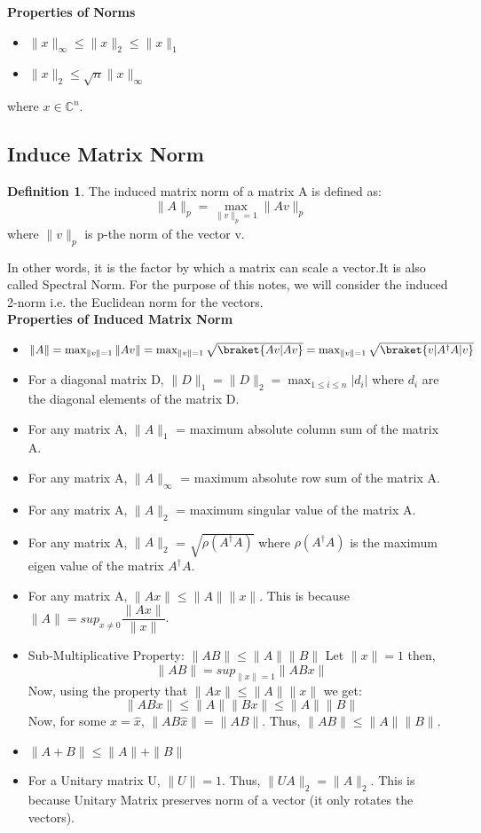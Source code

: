 \documentclass[12pt, oneside]{book}
\theoremstyle{definition}
\newtheorem{definition}{Definition}[section]
\theoremstyle{definition}
\theoremstyle{remark}
\begin{document}
\textbf{Properties of Norms}
\begin{itemize}
    \item $\|x\|_{\infty} \leq \|x\|_2 \leq \|x\|_1$
    \item $\|x\|_2 \leq \sqrt{n}\|x\|_{\infty}$
\end{itemize}
where $x \in \mathbb{C}^n$.\\

\subsection{Induce Matrix Norm}
\begin{definition}
    The induced matrix norm of a matrix A is defined as:
    \[ \|A\|_p=\max_{\|v\|_p=1} \|Av\|_p \]
    where $\|v\|_p$ is p-the norm of the vector v.
\end{definition}
In other words, it is the factor by which a matrix can scale a vector.It is 
also called Spectral Norm. For the purpose of this notes, we will consider the
induced 2-norm i.e. the Euclidean norm for the vectors.\\
\textbf{Properties of Induced Matrix Norm}
\begin{itemize}
    \item $\|A\|=\max_{\|v\|=1} \|Av\|=\max_{\|v\|=1} \sqrt{\braket{Av|Av}}=\max_{\|v\|=1} \sqrt{\braket{v|A^{\dagger}A|v}}$
    \item For a diagonal matrix D, $\|D\|_1 = \|D\|_2=\max_{1\leq i \leq n} |d_i|$ where $d_i$ are the diagonal elements of the matrix D.
    \item For any matrix A, $\|A\|_1$ = maximum absolute column sum of the matrix A.
    \item For any matrix A, $\|A\|_{\infty}$ = maximum absolute row sum of the matrix A.
    \item For any matrix A, $\|A\|_2$ = maximum singular value of the matrix A.
    \item For any matrix A, $\|A\|_2$ = $\sqrt{\rho(A^{\dagger}A)}$ where $\rho(A^{\dagger}A)$ is the maximum eigen value of the matrix $A^{\dagger}A$.
    \item For any matrix A, $\|Ax\|\leq \|A\|\|x\|$. This is because $\|A\| =sup_{x\neq 0} \dfrac{\|Ax\|}{\|x\|}$.
    \item Sub-Multiplicative Property: $\|AB\|\leq \|A\|\|B\|$
    Let $\|x\|=1$ then,
    \[ \|AB\|=sup_{\|x\|=1} \|ABx\|\]
    Now, using the property that $\|Ax\|\leq \|A\|\|x\|$ we get:
    \[ \|ABx\| \leq \|A\|\|Bx\| \leq \|A\|\|B\| \]
    Now, for some $x=\hat{x}$, $\|AB\hat{x}\|=\|AB\|$.
    Thus, $\|AB\|\leq \|A\|\|B\|$.
    \item $\|A+B\|\leq \|A\|+\|B\|$
    \item For a Unitary matrix U, $\|U\|=1$. Thus, $\|UA\|_2=\|A\|_2$. This is because Unitary Matrix preserves norm of a vector (it only rotates the vectors).
\end{itemize}
\end{document}

